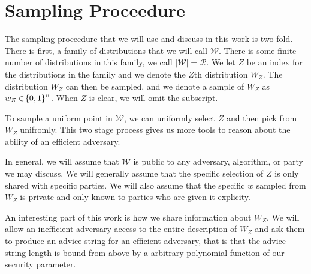 

\section{Sampling Proceedure}
The sampling proceedure that we will use and discuss in this work is two fold.
There is first, a family of distributions that we will call $\mathcal{W}$. 
There is some finite number of distributions in this family, we call $|\mathcal{W}| = \mathcal{R}$. 
We let $Z$ be an index for the distributions in the family and we denote the $Z$th distribution $W_Z$. 
The distribution $W_Z$ can then be sampled, and we denote a sample of $W_Z$ as $w_{Z} \in \!\left\{ 0,1 \right\}^{n}$. When $Z$ is clear, we will omit the subscript.

To sample a uniform point in $\mathcal{W}$, we can uniformly select $Z$ and then pick from $W_Z$ unifromly. 
This two stage process gives us more tools to reason about the ability of an efficient adversary. 

In general, we will assume that $\mathcal{W}$ is public to any adversary, algorithm, or party we may discuss. 
We will generally assume that the specific selection of $Z$ is only shared with specific parties.
We will also assume that the specific $w$ sampled from $W_Z$ is private and only known to parties who are given it explicity. 

An interesting part of this work is how we share information about $W_Z$. We will allow an inefficient adversary access to the entire description of $W_Z$ and ask them to produce an advice string for an efficient adversary, that is that the advice string length is bound from above by a arbitrary polynomial function of our security parameter. 


